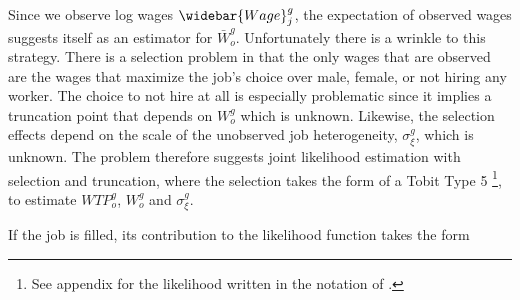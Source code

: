 \documentclass[11pt]{article}
\begin{document}

Since we observe log wages $\widebar{Wage}^g_j$, the expectation of observed wages suggests itself as an estimator for $\bar{W}^g_o$. Unfortunately there is a wrinkle to this strategy. There is a selection problem in that the only wages that are observed are the wages that maximize the job's choice over male, female, or not hiring any worker. The choice to not hire at all is especially problematic since it implies a truncation point that depends on $W^g_o$ which is unknown. Likewise, the selection effects depend on the scale of the unobserved job heterogeneity, $\sigma^g_\xi $, which is unknown. The problem therefore suggests joint likelihood estimation with selection and truncation, where the selection takes the form of a Tobit Type 5 \cite{Amemiya1985}\footnote{See appendix for the likelihood written in the notation of . }, to estimate $WTP^g_o$, $W^g_o$ and $\sigma^g_{\xi}$.

If the job is filled, its contribution to the likelihood function takes the form 

\end{document}
